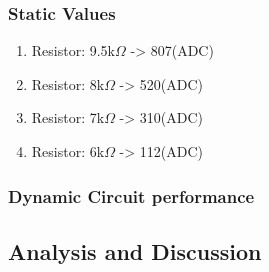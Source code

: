 \documentclass[twoside]{article}
\begin{document}
\subsubsection{Static Values}
\begin{enumerate}
	\item Resistor: 9.5k$\Omega$ -> 807(ADC)
    \item Resistor: 8k$\Omega$ -> 520(ADC)
    \item Resistor: 7k$\Omega$ -> 310(ADC)
    \item Resistor: 6k$\Omega$ -> 112(ADC)   
\end{enumerate}
\subsubsection{Dynamic Circuit performance}

\subsection{Analysis and Discussion}
\end{document}
